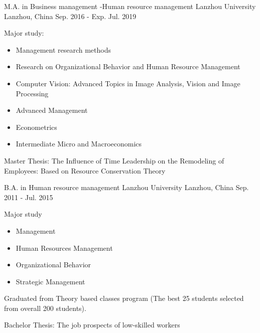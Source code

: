 \begin{cventries}
  \cventry
    {M.A. in Business management -Human resource management}
    {Lanzhou University}
    {Lanzhou, China}
    {Sep. 2016 - Exp. Jul. 2019}
    {
      \begin{cvitems}
        \item {
            Major study:
            \begin{itemize}
                \item Management research methods
                \item Research on Organizational Behavior and Human Resource Management
                \item Computer Vision: Advanced Topics in Image Analysis, Vision and Image Processing
                \item Advanced Management                
		\item Econometrics
		\item Intermediate Micro and Macroeconomics
	    \end{itemize}
        }
        \item {Master Thesis: The Influence of Time Leadership on the Remodeling of Employees: Based on Resource Conservation Theory}
      \end{cvitems}
    }
    \cventry
    {B.A. in Human resource management}
    {Lanzhou University}
    {Lanzhou, China}
    {Sep. 2011 - Jul. 2015}
    {
      \begin{cvitems}
        \item {
            Major study
            \begin{itemize}
                \item Management
                \item Human Resources Management
                \item Organizational Behavior
                \item Strategic Management            
	    \end{itemize}
        }
        \item {Graduated from Theory based classes program (The best 25 students selected from overall 200 students).}
        \item {Bachelor Thesis: The job prospects of low-skilled workers}
      \end{cvitems}
    }
\end{cventries}
